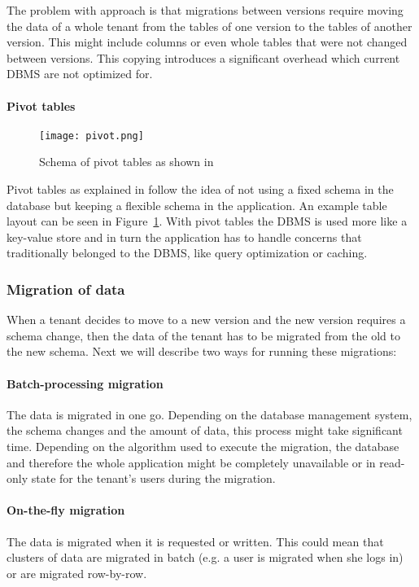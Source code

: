 The problem with approach is that migrations between versions require moving the data of a whole tenant from the tables of one version to the tables of another version. This might include columns or even whole tables that were not changed between versions. This copying introduces a significant overhead which  current DBMS are not optimized for.

%

\paragraph{Pivot tables}

\begin{figure}
\centering
\texttt{[image: pivot.png]}
\caption{Schema of pivot tables as shown in \cite{Yaish2011}}
\label{fig:pivot}
\end{figure}

Pivot tables as explained in \cite{Yaish2011} \cite{Aulbach2011} \cite{Weissman2009} follow the idea of not using a fixed schema in the database but keeping a flexible schema in the application. An example table layout can be seen in Figure~\ref{fig:pivot}. With pivot tables the DBMS is used more like a key-value store and in turn the application has to handle concerns that traditionally belonged to the DBMS, like query optimization or caching.

\subsubsection{Migration of data}

When a tenant decides to move to a new version and the new version requires a schema change, then the data of the tenant has to be migrated from the old to the new schema. Next we will describe two ways for running these migrations:

\paragraph{Batch-processing migration} The data is migrated in one go. Depending on the database management system, the schema changes and the amount of data, this process might take significant time. Depending on the algorithm used to execute the migration, the database and therefore the whole application might be completely unavailable or in read-only state for the tenant's users during the migration.
\paragraph{On-the-fly migration} The data is migrated when it is requested or written. This could mean that clusters of data are migrated in batch (e.g. a user is migrated when she logs in) or are migrated row-by-row.

